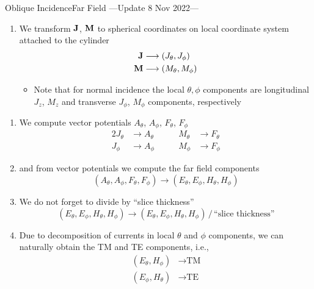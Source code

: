 \begin{frame}[allowframebreaks]{Oblique Incidence}{Far Field
    ---{Update 8 Nov 2022}---}
\begin{enumerate}
     \item We transform $\mathbf{J}$, $\mathbf{M}$ to spherical coordinates on local
       coordinate system attached to the cylinder
       \begin{align*}
         \mathbf{J} &\longrightarrow (J_\theta,J_\phi) \\
         \mathbf{M} &\longrightarrow (M_\theta,M_\phi) 
       \end{align*}
       
       \begin{itemize}
       \item Note that for normal incidence the local $\theta,\phi$
         components are longitudinal $J_z$, $M_z$ and transverse
         $J_\phi$, $M_\phi$ components, respectively
       \end{itemize}

       \saveenum

    \end{enumerate}


    \framebreak %

    
    \begin{enumerate}
      \resumeenum

    \item We compute vector potentials $A_\theta$, $A_\phi$,
      $F_\theta$, $F_\phi$
      \begin{alignat*}{2}
        J_\theta &\rightarrow A_\theta
        & \qquad M_\theta &\longrightarrow F_\theta \\
        J_\phi &\rightarrow A_\phi
        & \qquad M_\phi &\longrightarrow F_\phi
      \end{alignat*}
      

    \item and from vector potentials we compute the far field components
      \begin{equation*}
        (A_\theta,A_\phi,F_\theta,F_\phi) \longrightarrow (E_\theta,E_\phi,H_\theta,H_\phi)
      \end{equation*}

    \item We do not forget to divide by ``slice thickness''
      \begin{equation*}
        (E_\theta,E_\phi,H_\theta,H_\phi) \longrightarrow
             (E_\theta,E_\phi,H_\theta,H_\phi) \, / \, \text{``slice thickness''}
      \end{equation*}
      
    \item Due to decomposition of currents in \alert{local} $\theta$ and $\phi$
      components, we can \alert{naturally obtain the TM and TE components}, i.e.,
      \begin{align*}
        (E_\theta,H_\phi) &\longrightarrow \text{TM} \\
        (E_\phi,H_\theta) &\longrightarrow \text{TE} 
      \end{align*}


\end{enumerate}
\end{frame}
